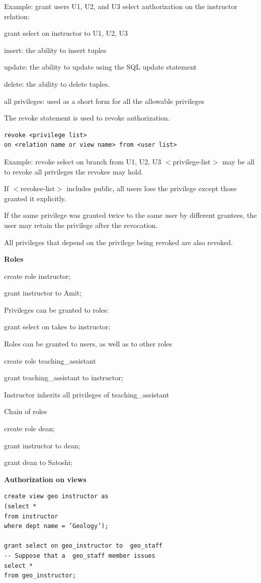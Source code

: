 \documentclass[8pt, a4paper, oneside, twocolumn]{extarticle}
\begin{document}
Example: grant users U1, U2, and U3 select authorization on the instructor relation:

            grant select on instructor to U1, U2, U3

insert: the ability to insert tuples

update: the ability  to update using the SQL update statement

delete: the ability to delete tuples.

all privileges: used as a short form for all the allowable privileges

The revoke statement is used to revoke authorization.
\begin{verbatim}
revoke <privilege list>
on <relation name or view name> from <user list>
\end{verbatim}

Example:
revoke select on branch  from U1, U2, U3
$<$privilege-list$>$ may be all to revoke all privileges the revokee may hold.

If $<$revokee-list$>$ includes public, all users lose the privilege except those granted it explicitly.

If the same privilege was granted twice to the same user by different grantees, the user may retain the privilege after the revocation.

All privileges that depend on the privilege being revoked are also revoked.

\textbf{Roles}

create role instructor;

grant instructor to Amit;

Privileges can be granted to roles:

grant select on takes to instructor;

Roles can be granted to users, as well as to other roles

create role teaching\_assistant

grant teaching\_assistant to instructor;

Instructor inherits all privileges of teaching\_assistant

Chain of roles

create role dean;

grant instructor to dean;

grant dean to Satoshi;

\textbf{Authorization on views}

\begin{verbatim}
create view geo instructor as
(select *
from instructor
where dept name = ’Geology’);

grant select on geo_instructor to  geo_staff
-- Suppose that a  geo_staff member issues
select *
from geo_instructor;
\end{verbatim}
\end{document}
